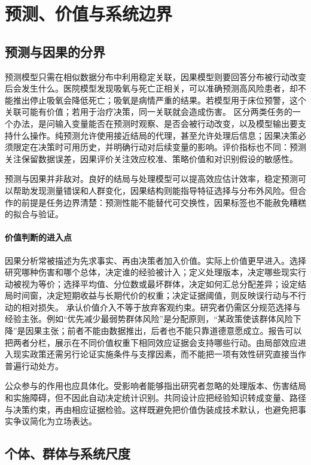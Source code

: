 \section{预测、价值与系统边界}

\subsection{预测与因果的分界}

预测模型只需在相似数据分布中利用稳定关联，因果模型则要回答分布被行动改变后会发生什么。医院模型发现吸氧与死亡正相关，可以准确预测高风险患者，却不能推出停止吸氧会降低死亡；吸氧是病情严重的结果。若模型用于床位预警，这个关联可能有价值；若用于治疗决策，同一关联就会造成伤害。
区分两类任务的一个办法，是问输入变量能否在预测时观察、是否会被行动改变，以及模型输出要支持什么操作。纯预测允许使用接近结局的代理，甚至允许处理后信息；因果决策必须限定在决策时可用历史，并明确行动对后续变量的影响。评价指标也不同：预测关注保留数据误差，因果评价关注效应校准、策略价值和对识别假设的敏感性。

预测与因果并非敌对。良好的结局与处理模型可以提高效应估计效率，稳定预测可以帮助发现测量错误和人群变化，因果结构则能指导特征选择与分布外风险。但合作的前提是任务边界清楚：预测性能不能替代可交换性，因果标签也不能赦免糟糕的拟合与验证。

\paragraph{价值判断的进入点}

因果分析常被描述为先求事实、再由决策者加入价值。实际上价值更早进入。选择研究哪种伤害和哪个总体，决定谁的经验被计入；定义处理版本，决定哪些现实行动被视为等价；选择平均值、分位数或最坏群体，决定如何汇总分配差异；设定结局时间窗，决定短期收益与长期代价的权重；决定证据阈值，则反映误行动与不行动的相对损失。
承认价值介入不等于放弃客观约束。研究者仍需区分规范选择与经验主张。例如“优先减少最弱势群体风险”是分配原则，“某政策使该群体风险下降”是因果主张；前者不能由数据推出，后者也不能只靠道德意愿成立。报告可以把两者分栏，展示在不同价值权重下相同效应证据会支持哪些行动。由局部效应进入现实政策还需另行论证实施条件与支撑因素，而不能把一项有效性研究直接当作普遍行动处方\parencite{cartwrighthardie2012}。

公众参与的作用也应具体化。受影响者能够指出研究者忽略的处理版本、伤害结局和实施障碍，但不因此自动决定统计识别。共同设计应把经验知识转成变量、路径与决策约束，再由相应证据检验。这样既避免把价值伪装成技术默认，也避免把事实争议简化为立场表达。

\subsection{个体、群体与系统尺度}

